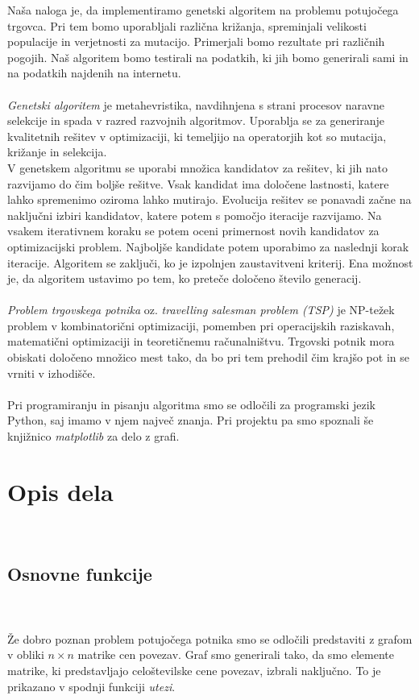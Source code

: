 \documentclass[12pt,a4paper]{amsart}
\theoremstyle{definition} %
\theoremstyle{plain} %
\begin{document}
Naša naloga je, da implementiramo genetski algoritem na problemu potujočega trgovca. Pri tem bomo uporabljali različna križanja, spreminjali velikosti populacije in verjetnosti za mutacijo. Primerjali bomo rezultate pri različnih pogojih. Naš algoritem bomo testirali na podatkih, ki jih bomo generirali sami in na podatkih najdenih na internetu. 
\\
\\
\textit{Genetski algoritem} je metahevristika, navdihnjena s strani procesov naravne selekcije in spada v razred razvojnih
algoritmov. Uporablja se za generiranje kvalitetnih rešitev v optimizaciji, ki temeljijo na operatorjih kot so mutacija, križanje
in selekcija.  
\\
V genetskem algoritmu se uporabi množica kandidatov za rešitev, ki jih nato razvijamo do čim boljše rešitve. Vsak kandidat
ima določene lastnosti, katere lahko spremenimo oziroma lahko mutirajo. Evolucija rešitev se ponavadi začne na naključni izbiri kandidatov, katere potem s pomočjo iteracije razvijamo. Na vsakem iterativnem koraku se potem oceni primernost novih kandidatov za optimizacijski problem. Najboljše kandidate potem uporabimo za naslednji korak iteracije. Algoritem se zaključi, ko je izpolnjen zaustavitveni kriterij. Ena možnost je, da algoritem ustavimo po tem, ko preteče določeno število generacij.
\\
\\
\textit{Problem trgovskega potnika} oz. \textit{travelling salesman problem (TSP)} je NP-težek problem v kombinatorični optimizaciji, pomemben pri operacijskih raziskavah, matematični optimizaciji in teoretičnemu računalništvu. Trgovski potnik mora obiskati določeno množico mest tako, da bo pri tem prehodil čim krajšo pot in se vrniti v izhodišče.
\\
\\
Pri programiranju in pisanju algoritma smo se odločili za programski jezik Python, saj imamo v njem največ znanja. Pri projektu pa smo spoznali še knjižnico \textit{matplotlib} za delo z grafi. 
\\

\newpage
\section{Opis dela}
\
\subsection{Osnovne funkcije}
\
\\
\\
Že dobro poznan problem potujočega potnika smo se odločili predstaviti z grafom v obliki $n \times n$ matrike cen povezav. Graf smo generirali tako, da smo elemente matrike, ki predstavljajo celoštevilske cene povezav, izbrali naključno. To je prikazano v spodnji funkciji \textit{utezi}.
\end{document}
